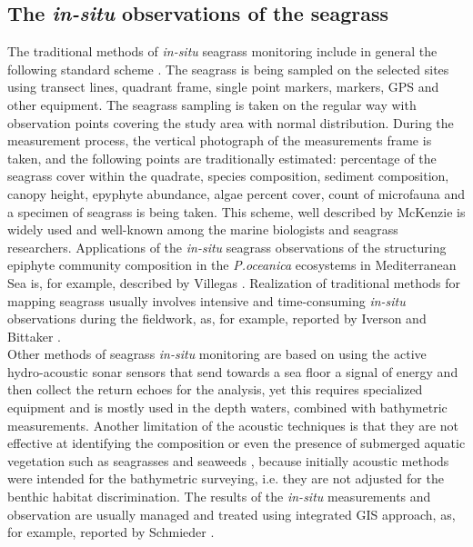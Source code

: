 \documentclass[10pt, a4paper]{article}
\begin{document}
\subsection[\textit{In-situ} observations of the seagrass]{The \textit{in-situ} observations of the seagrass}
The traditional methods of \textit{in-situ} seagrass monitoring include in general the following standard
scheme \cite{McKenzieetal03} \label{McKenzieetal03}. The seagrass is being sampled on the selected sites using transect lines,
quadrant frame, single point markers, markers, GPS and other equipment. The seagrass sampling is
taken on the regular way with observation points covering the study area with normal distribution.
During the measurement process, the vertical photograph of the measurements frame is taken, and the
following points are traditionally estimated: percentage of the seagrass cover within the quadrate,
species composition, sediment composition, canopy height, epyphyte abundance, algae percent cover,
count of microfauna and a specimen of seagrass is being taken. This scheme, well described by
McKenzie \cite{McKenzieetal03}\label{McKenzieetal03} is widely used and well-known among the marine biologists and
seagrass researchers. Applications of the \textit{in-situ} seagrass observations of the structuring epiphyte
community composition in the \textit{P.oceanica} ecosystems in Mediterranean Sea is, for example,
described by Villegas \cite{Villegas06}\label{Villegas06}. Realization of traditional methods for mapping seagrass usually
involves intensive and time-consuming \textit{in-situ} observations during the fieldwork, as, for example,
reported by Iverson and Bittaker \cite{Iverson86}\label{Iverson86}. \\
Other methods of seagrass \textit{in-situ} monitoring are based on
using the active hydro-acoustic sonar sensors that send towards a sea floor a signal of energy and then
collect the return echoes for the analysis, yet this requires specialized equipment and is mostly used in
the depth waters, combined with bathymetric measurements. Another limitation of the acoustic
techniques is that they are not effective at identifying the composition or even the presence of
submerged aquatic vegetation such as seagrasses and seaweeds \cite{Werdell03}\label{Werdell03}, because
initially acoustic methods were intended for the bathymetric surveying, i.e. they are not adjusted for
the benthic habitat discrimination. The results of the \textit{in-situ} measurements and observation are usually
managed and treated using integrated GIS approach, as, for example, reported by Schmieder \cite{Schmieder97}\label{Schmieder97}.
\end{document}

